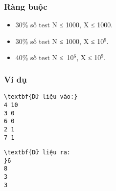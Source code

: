 \subsubsection{Ràng buộc}
\begin{itemize}
	\item 30\% số test N ≤ 1000, X ≤ 1000.
	\item 30\% số test N ≤ 1000, X ≤ 10$^9$.
	\item 40\% số test N ≤ 10$^6$, X ≤ 10$^9$.
\end{itemize}

\subsubsection{Ví dụ}
\begin{verbatim}
\textbf{Dữ liệu vào:}
4 10
3 0
6 0
2 1
7 1\end{verbatim}
\begin{verbatim}
\textbf{Dữ liệu ra:
}6
8
3
3\end{verbatim}

 
